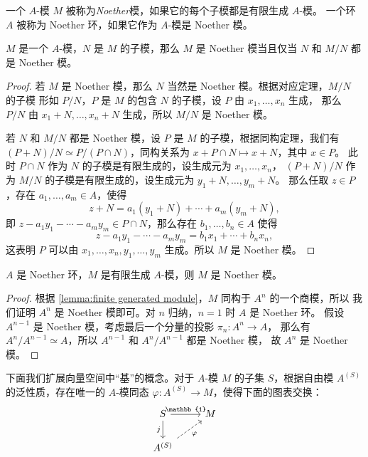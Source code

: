 \begin{definition}
  一个 $A$-模 $M$ 被称为\emph{Noether}模，如果它的每个子模都是有限生成 $A$-模。
  一个环 $A$ 被称为 Noether 环，如果它作为 $A$-模是 Noether 模。
\end{definition}

\begin{proposition}
  $M$ 是一个 $A$-模，$N$ 是 $M$ 的子模，那么 $M$ 是 Noether 模当且仅当 $N$
  和 $M/N$ 都是 Noether 模。
\end{proposition}
\begin{proof}
  若 $M$ 是 Noether 模，那么 $N$ 当然是 Noether 模。根据对应定理，$M/N$ 的子模
  形如 $P/N$，$P$ 是 $M$ 的包含 $N$ 的子模，设 $P$ 由 $x_1,\dots,x_n$ 生成，
  那么 $P/N$ 由 $x_1+N,\dots,x_n+N$ 生成，所以 $M/N$ 是 Noether 模。

  若 $N$ 和 $M/N$ 都是 Noether 模，设 $P$ 是 $M$ 的子模，根据同构定理，我们有
  $(P+N)/N\simeq P/(P\cap N)$，同构关系为 $x+P\cap N\mapsto x+N$，其中 $x\in P$。
  此时 $P\cap N$ 作为 $N$ 的子模是有限生成的，设生成元为 $x_1,\dots,x_n$，
  $(P+N)/N$ 作为 $M/N$ 的子模是有限生成的，设生成元为 $y_1+N,\dots,y_m+N$。
  那么任取 $z\in P$，存在 $a_1,\dots,a_m\in A$，使得
  \[
    z+N=a_1(y_1+N)  +\cdots+a_m(y_m+N),
  \]
  即 $z-a_1y_1-\cdots-a_my_m\in P\cap N$，那么存在 $b_1,\dots,b_n\in A$ 使得
  \[
    z-a_1y_1-\cdots-a_my_m=b_1x_1+\cdots+b_nx_n,  
  \]
  这表明 $P$ 可以由 $x_1,\dots,x_n,y_1,\dots,y_m$ 生成。所以 $M$ 是 Noether 模。
\end{proof}

\begin{corollary}\label{coro:finite generated module over Noether ring}
  $A$ 是 Noether 环，$M$ 是有限生成 $A$-模，则 $M$ 是 Noether 模。
\end{corollary}
\begin{proof}
  根据 \autoref{lemma:finite generated module}，$M$ 同构于 $A^n$ 的一个商模，所以
  我们证明 $A^n$ 是 Noether 模即可。对 $n$ 归纳，$n=1$ 时 $A$ 是 Noether 环。
  假设 $A^{n-1}$ 是 Noether 模，考虑最后一个分量的投影 $\pi_n:A^n\to A$，
  那么有 $A^n/A^{n-1}\simeq A$，所以 $A^{n-1}$ 和 $A^n/A^{n-1}$ 都是 Noether 模，
  故 $A^n$ 是 Noether 模。
\end{proof}

下面我们扩展向量空间中“基”的概念。对于 $A$-模 $M$ 的子集 $S$，根据自由模
$A^{(S)}$ 的泛性质，存在唯一的 $A$-模同态 $\varphi:A^{(S)}\to M$，使得下面的图表交换：
\[
  \begin{tikzcd}
    S \arrow[d,"j"']\arrow[r,"\mathbb{1}"] & M \\
    A^{(S)}\arrow[ur,dashed,"\varphi"'] & 
  \end{tikzcd}
\]

